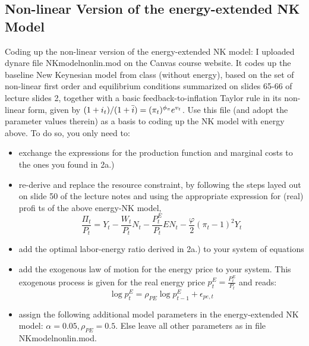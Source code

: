 \documentclass[a4paper,11pt]{article}
\begin{document}
\pagebreak
\begin{qbox}{\subsection{Non-linear Version of the energy-extended NK Model}}
Coding up the non-linear version of the energy-extended NK model: I uploaded dynare file NKmodelnonlin.mod on the Canvas course website. It codes up the baseline New Keynesian model from class (without energy), based on the set of non-linear first order and equilibrium conditions summarized on slides 65-66 of lecture slides 2, together with a basic feedback-to-inflation Taylor rule in its non-linear form, given by $(1+i_t)/(1+\Bar{i})=(\pi_t)^{\phi_\pi}e^{v_t}$. Use this file (and adopt the parameter values therein) as a basis to coding up the NK model with energy above. To do so, you only need to:
    \begin{itemize}
        \item exchange the expressions for the production function and marginal costs to the ones you found in 2a.)
        \item re-derive and replace the resource constraint, by following the steps layed out on slide 50 of the lecture notes and using the appropriate  expression for (real) profi ts of the above energy-NK model,
        $$\frac{\Pi_t}{P_t} = Y_t - \frac{W_t}{P_t}N_t - \frac{P^E_t}{P_t}EN_t - \frac{\varphi}{2}\left(\pi_t-1\right)^2Y_t$$
        \item add the optimal labor-energy ratio derived in 2a.) to your system of equations
        \item add the exogenous law of motion for the energy price to your system. This exogenous process is given for the real energy price $p^E_t = \frac{P^E_t}{P_t}$ and reads:
        $$\log p^E_t = \rho_{PE} \log p^E_{t-1}+\epsilon_{pe,t}$$
        \item assign the following additional model parameters in the energy-extended NK model: $\alpha = 0.05, \rho_{PE} = 0.5$. Else leave all other parameters as in file NKmodelnonlin.mod.
    \end{itemize}
\end{qbox}
\end{document}
